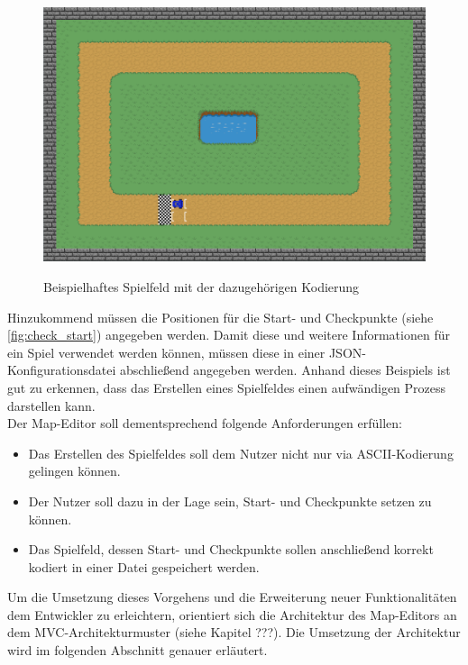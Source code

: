 \begin{figure}[h]
\begin{minipage}{1.0\textwidth}
\begin{minipage}[t]{0.2\textwidth}
\begin{spacing}{1.0}
\end{spacing}
\fontnormal
\end{minipage}
\end{minipage}
\begin{minipage} {0.9\textwidth}
\centering
\includegraphics[scale=0.25]{pics/simples_spielfeld.png}
\label{fig:check_start}
\end{minipage}
\caption{Beispielhaftes Spielfeld mit der dazugehörigen Kodierung}
\label{fig:simple_kodiert}
\end{figure}

Hinzukommend müssen die Positionen für die Start- und Checkpunkte (siehe \autoref{fig:check_start}) angegeben werden. Damit diese und weitere Informationen für ein Spiel verwendet werden können, müssen diese in einer JSON-Konfigurationsdatei abschließend angegeben werden. Anhand dieses Beispiels ist gut zu erkennen, dass das Erstellen eines Spielfeldes einen aufwändigen Prozess darstellen kann.\\
Der Map-Editor soll dementsprechend folgende Anforderungen erfüllen:
\begin{itemize}
\item Das Erstellen des Spielfeldes soll dem Nutzer nicht nur via ASCII-Kodierung gelingen können.
\item Der Nutzer soll dazu in der Lage sein, Start- und Checkpunkte setzen zu können.
\item Das Spielfeld, dessen Start- und Checkpunkte sollen anschließend korrekt kodiert in einer Datei gespeichert werden.
\end{itemize}
Um die Umsetzung dieses Vorgehens und die Erweiterung neuer Funktionalitäten dem Entwickler zu erleichtern, orientiert sich die Architektur des Map-Editors an dem MVC-Architekturmuster (siehe Kapitel ???). Die Umsetzung der Architektur wird im folgenden Abschnitt genauer erläutert.


